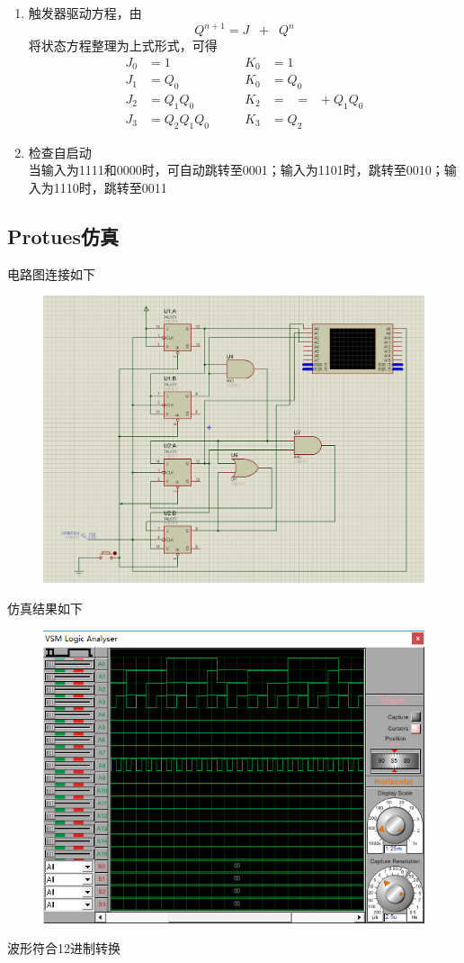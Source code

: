 \documentclass[11pt,UTF8]{ctexart}
\newcommand{\ol}[1]{\mathop{\overline{#1}}}%
\begin{document}
\begin{enumerate}
    \item 触发器驱动方程，由
    \[Q^{n+1}=J\ol{Q^n}+\ol{K}Q^n\]
    将状态方程整理为上式形式，可得
    \[\begin{aligned}
    J_0&=1 \qquad &K_0&=1\\
    J_1&=Q_0 \qquad &K_0&=Q_0\\
    J_2&=Q_1Q_0 \qquad &K_2&=\ol{\ol{Q_3}\ol{Q_1}+\ol{Q_3}\ol{Q_0}}=\ol{Q_3}+Q_1Q_0\\
    J_3&=Q_2Q_1Q_0 \qquad &K_3&=Q_2
    \end{aligned}\]
    \item 检查自启动\\
    当输入为1111和0000时，可自动跳转至0001；输入为1101时，跳转至0010；输入为1110时，跳转至0011
\end{enumerate}

\subsection{Protues仿真}
\par 电路图连接如下
\begin{figure}[H]
    \centering
    \includegraphics[width=0.9\linewidth]{fig/12system_protues.PNG}
\end{figure}
\par 仿真结果如下
\begin{figure}[H]
    \centering
    \includegraphics[width=0.6\linewidth]{fig/12system_wave.PNG}
\end{figure}
\par 波形符合12进制转换
\end{document}
